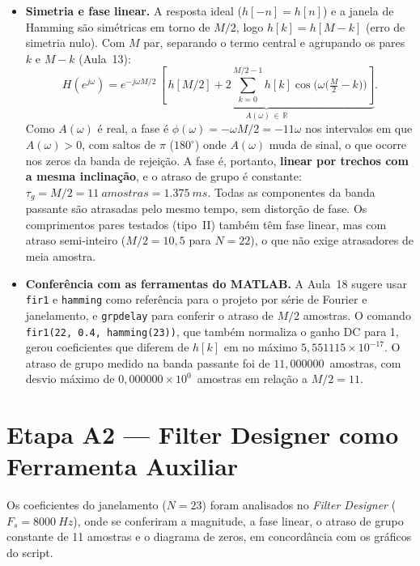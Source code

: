 \documentclass[11pt,a4paper]{article}
\newcommand{\MetricaAErroFirI}{5{,}551115\times 10^{-17}}
\newcommand{\MetricaAAtrasoGdMedio}{11{,}000000}
\newcommand{\MetricaAAtrasoGdDesvio}{0{,}000000\times 10^{0}}
\begin{document}
\begin{itemize}[leftmargin=1.5em, itemsep=3pt]
    \item \textbf{Simetria e fase linear.} A resposta ideal ($h[-n] = h[n]$) e a janela de Hamming são simétricas em torno de $M/2$, logo $h[k] = h[M-k]$ (erro de simetria nulo). Com $M$ par, separando o termo central e agrupando os pares $k$ e $M - k$ (Aula~13):
    \begin{equation}
        H(e^{j\omega}) = e^{-j\omega M/2}\, \underbrace{\left[\, h[M/2] + 2\sum_{k=0}^{M/2-1} h[k]\cos\!\Big(\omega\big(\tfrac{M}{2} - k\big)\Big) \right]}_{A(\omega)\,\in\,\mathbb{R}}.
    \end{equation}
    Como $A(\omega)$ é real, a fase é $\phi(\omega) = -\omega M/2 = -11\omega$ nos intervalos em que $A(\omega) > 0$, com saltos de $\pi$ ($180^\circ$) onde $A(\omega)$ muda de sinal, o que ocorre nos zeros da banda de rejeição. A fase é, portanto, \textbf{linear por trechos com a mesma inclinação}, e o atraso de grupo é constante: $\tau_g = M/2 = \SI{11}{amostras} = \SI{1,375}{ms}$. Todas as componentes da banda passante são atrasadas pelo mesmo tempo, sem distorção de fase. Os comprimentos pares testados (tipo~II) também têm fase linear, mas com atraso semi-inteiro ($M/2 = 10,5$ para $N = 22$), o que não exige atrasadores de meia amostra.

    \item \textbf{Conferência com as ferramentas do MATLAB.} A Aula~18 sugere usar \texttt{fir1} e \texttt{hamming} como referência para o projeto por série de Fourier e janelamento, e \texttt{grpdelay} para conferir o atraso de $M/2$ amostras. O comando \texttt{fir1(22, 0.4, hamming(23))}, que também normaliza o ganho DC para 1, gerou coeficientes que diferem de $h[k]$ em no máximo $\MetricaAErroFirI$. O atraso de grupo medido na banda passante foi de $\MetricaAAtrasoGdMedio$~amostras, com desvio máximo de $\MetricaAAtrasoGdDesvio$~amostras em relação a $M/2 = 11$.
\end{itemize}

\section{Etapa A2 — Filter Designer como Ferramenta Auxiliar}

Os coeficientes do janelamento ($N = 23$) foram analisados no \textit{Filter Designer} ($F_s = \SI{8000}{Hz}$), onde se conferiram a magnitude, a fase linear, o atraso de grupo constante de 11 amostras e o diagrama de zeros, em concordância com os gráficos do script.
\end{document}
